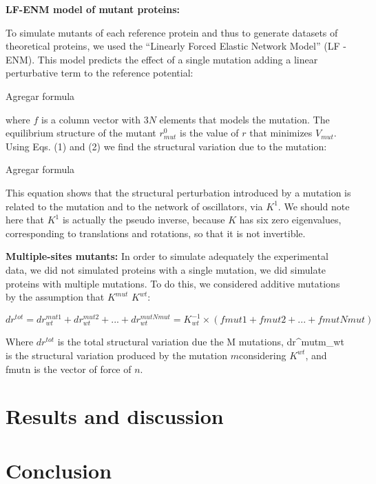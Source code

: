 \documentclass{article}
\begin{document}
{\bf LF-ENM model of mutant proteins:}

To simulate mutants of each reference protein and thus to generate datasets of theoretical proteins, we used the ``Linearly Forced Elastic Network Model'' (LF - ENM). This model predicts the effect of a single mutation adding a linear perturbative term to the reference potential:

Agregar formula

where $f$ is a column vector with $3N$ elements that models the mutation. The equilibrium structure of the mutant $r^{0}_{mut}$ is the value of $r$ that minimizes $V_{mut}$. Using Eqs. (1) and (2) we find the structural variation due to the mutation:

Agregar formula

This equation shows that the structural perturbation introduced by a mutation is related to the mutation and to the network of oscillators, via $K^{1}$. We should note here that $K^{1}$ is actually the pseudo inverse, because $K$ has six zero eigenvalues, corresponding to translations and rotations, so that it is not invertible.

{\bf Multiple-sites mutants: }
In order to simulate adequately the experimental data, we did not simulated proteins with a single mutation, we did simulate proteins with multiple mutations. To do this, we considered additive mutations by the assumption that $K^{mut}$ \cong $K^{wt}$:

\begin{equation}
dr^{tot} = dr^{mut1}_{wt} + dr^{mut2}_{wt} + ... + dr^{mutNmut}_{wt} = K^{-1}_{wt} \times (fmut1+fmut2+...+fmutNmut) 
\end{equation}

Where $dr^{tot}$ is the total structural variation due the M mutations, dr^{mutm}_{wt} is the structural variation produced by the mutation $m$considering $K^{wt}$, and fmutn is the vector of force of $n$.

\section{Results and discussion}

\section{Conclusion}
\end{document}
